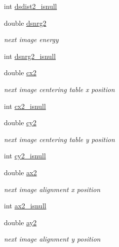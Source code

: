 \begin{DoxyCompactItemize}
int \hyperlink{structlspg__nextshot__struct_a7fce65f4719a4a8110006f8b72eec3f7}{dsdist2\_\-isnull}
\item 
double \hyperlink{structlspg__nextshot__struct_ae461439c2af31255227765c0fb61850f}{dsnrg2}
\begin{DoxyCompactList}\small\item\em next image energy \item\end{DoxyCompactList}\item 
int \hyperlink{structlspg__nextshot__struct_aee9f8196dd9bcea832a60f2f0ea3a999}{dsnrg2\_\-isnull}
\item 
double \hyperlink{structlspg__nextshot__struct_a10d45763100bc59f9a5f68f1b48db6d3}{cx2}
\begin{DoxyCompactList}\small\item\em next image centering table x position \item\end{DoxyCompactList}\item 
int \hyperlink{structlspg__nextshot__struct_a3ad947f4efe2cb5c338244b019334749}{cx2\_\-isnull}
\item 
double \hyperlink{structlspg__nextshot__struct_a3644e5c3f12af18a3b426d4d4d7e16a5}{cy2}
\begin{DoxyCompactList}\small\item\em next image centering table y position \item\end{DoxyCompactList}\item 
int \hyperlink{structlspg__nextshot__struct_a57d78a389413827302df6ebe3dcb3c89}{cy2\_\-isnull}
\item 
double \hyperlink{structlspg__nextshot__struct_ab76bd38d2a098bc7eda82aff5dcb9c66}{ax2}
\begin{DoxyCompactList}\small\item\em next image alignment x position \item\end{DoxyCompactList}\item 
int \hyperlink{structlspg__nextshot__struct_a846845b0b9ecf6517ef85554771ec71d}{ax2\_\-isnull}
\item 
double \hyperlink{structlspg__nextshot__struct_ad13759740204b42e379161f98815f3d0}{ay2}
\begin{DoxyCompactList}\small\item\em next image alignment y position \item\end{DoxyCompactList}\item 

\end{DoxyCompactItemize}
